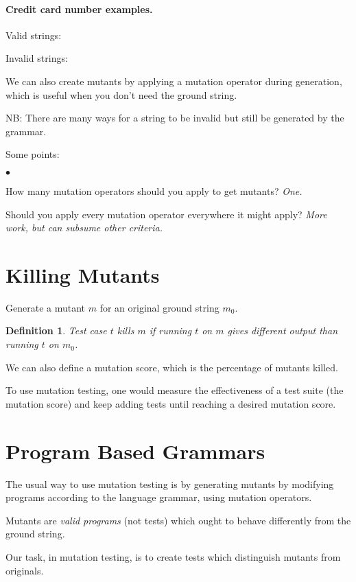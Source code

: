 \documentclass[11pt]{article}
\newtheorem{defn}{Definition}
\newcommand{\squishlist}{
 \begin{list}{$\bullet$}
  { \setlength{\itemsep}{0pt}
     \setlength{\parsep}{3pt}
     \setlength{\topsep}{3pt}
     \setlength{\partopsep}{0pt}
     \setlength{\leftmargin}{1.5em}
     \setlength{\labelwidth}{1em}
     \setlength{\labelsep}{0.5em} } }
\newcommand{\squishend}{
  \end{list}  }
\begin{document}
\paragraph{Credit card number examples.}
{\sf Valid strings:} %

\noindent
{\sf Invalid strings:} %

We can also create mutants by applying a mutation operator during generation,
which is useful when you don't need the ground string.

NB: There are many ways for a string to be invalid but still be generated
by the grammar.

\newpage
Some points:
\squishlist
\item How many mutation operators should you apply to get mutants? \emph{One.}
\item Should you apply every mutation operator everywhere it might apply? \emph{More work, but can subsume other criteria.}
\squishend

\section*{Killing Mutants} 
Generate a mutant $m$ for an original ground string $m_0$.
\begin{defn}
Test case $t$ \emph{kills} $m$ if running $t$ on $m$ gives different 
output than running $t$ on $m_0$.
\end{defn}

We can also define a mutation score, which is the percentage of mutants killed.

To use
mutation testing, one would measure the effectiveness of a test
suite (the mutation score) and keep adding tests until reaching a desired
mutation score.

\section*{Program Based Grammars} 

The usual way to use mutation testing is by generating mutants 
by modifying programs according to the language grammar,
using mutation operators.

Mutants are \emph{valid programs} (not tests) which ought to behave
differently from the ground string.

Our task, in mutation testing, is to create tests which distinguish
mutants from originals.
\end{document}
